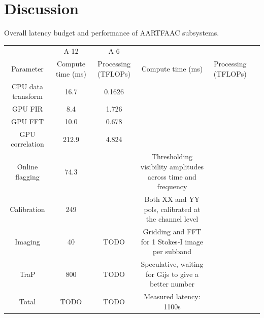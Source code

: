 \documentclass{ws-jai}
\begin{document}

\section {\label{sec:discussion} Discussion}
\begin{wstable}[h]
\caption{Overall latency budget and performance of AARTFAAC subsystems.}
\begin{tabular}{@{}cccccc@{}} \toprule
 & A-12 & A-6 \\ \colrule
Parameter & Compute time (ms) & Processing (TFLOPs) & Compute time (ms)  & Processing (TFLOPs) \\ \colrule
CPU data transform & 16.7 & 0.1626  \\
GPU FIR & 8.4 & 1.726\\
GPU FFT & 10.0 & 0.678  \\
GPU correlation & 212.9 & 4.824  \\
Online flagging & 74.3 &  & Thresholding visibility amplitudes across time and frequency\\
Calibration & 249 & & Both XX and YY pols, calibrated at the channel level \\
Imaging & 40 & TODO & Gridding and FFT for 1 Stokes-I image per subband \\ 
TraP & 800 & TODO & Speculative, waiting for Gijs to give a better number\\
 \colrule
Total & TODO & TODO & Measured latency: 1100s
\end{tabular}
\label{tab:afaac_latency}
\end{wstable}

\end{document}
